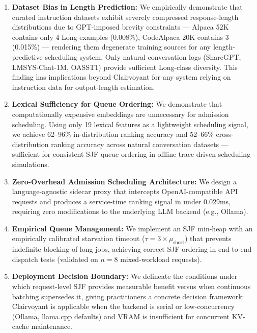 \documentclass[10pt,letterpaper]{article}
\begin{document}
\begin{enumerate}
  \item \textbf{Dataset Bias in Length Prediction:} We empirically demonstrate that curated instruction datasets exhibit severely compressed response-length distributions due to GPT-imposed brevity constraints --- Alpaca 52K contains only 4 Long examples (0.008\%), CodeAlpaca 20K contains 3 (0.015\%) --- rendering them degenerate training sources for any length-predictive scheduling system. Only natural conversation logs (ShareGPT, LMSYS-Chat-1M, OASST1) provide sufficient Long-class diversity. This finding has implications beyond Clairvoyant for any system relying on instruction data for output-length estimation.

  \item \textbf{Lexical Sufficiency for Queue Ordering:} We demonstrate that computationally expensive embeddings are unnecessary for admission scheduling. Using only 19 lexical features as a lightweight scheduling signal, we achieve 62--96\% in-distribution ranking accuracy and 52--66\% cross-distribution ranking accuracy across natural conversation datasets --- sufficient for consistent SJF queue ordering in offline trace-driven scheduling simulations.

  \item \textbf{Zero-Overhead Admission Scheduling Architecture:} We design a language-agnostic sidecar proxy that intercepts OpenAI-compatible API requests and produces a service-time ranking signal in under 0.029ms, requiring zero modifications to the underlying LLM backend (e.g., Ollama).

  \item \textbf{Empirical Queue Management:} We implement an SJF min-heap with an empirically calibrated starvation timeout ($\tau = 3 \times \mu_{\text{short}}$) that prevents indefinite blocking of long jobs, achieving correct SJF ordering in end-to-end dispatch tests (validated on $n=8$ mixed-workload requests).

  \item \textbf{Deployment Decision Boundary:} We delineate the conditions under which request-level SJF provides measurable benefit versus when continuous batching supersedes it, giving practitioners a concrete decision framework: Clairvoyant is applicable when the backend is serial or low-concurrency (Ollama, llama.cpp defaults) and VRAM is insufficient for concurrent KV-cache maintenance.
\end{enumerate}
\end{document}
